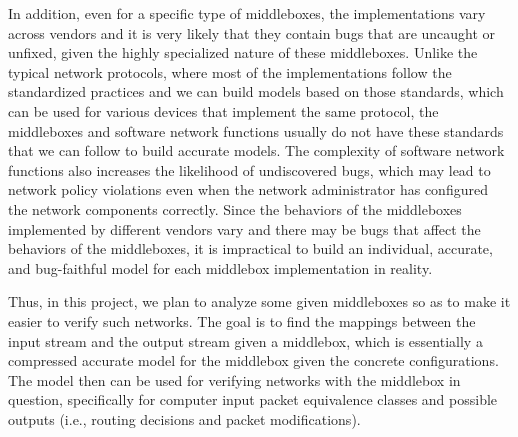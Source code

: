 In addition, even for a specific type of middleboxes, the implementations vary
across vendors and it is very likely that they contain bugs that are uncaught or
unfixed, given the highly specialized nature of these middleboxes. Unlike the
typical network protocols, where most of the implementations follow the
standardized practices and we can build models based on those standards, which
can be used for various devices that implement the same protocol, the
middleboxes and software network functions usually do not have these standards
that we can follow to build accurate models. The complexity of software network
functions also increases the likelihood of undiscovered bugs, which may lead to
network policy violations even when the network administrator has configured the
network components correctly. Since the behaviors of the middleboxes implemented
by different vendors vary and there may be bugs that affect the behaviors of the
middleboxes, it is impractical to build an individual, accurate, and
bug-faithful model for each middlebox implementation in reality.

Thus, in this project, we plan to analyze some given middleboxes so as to make
it easier to verify such networks. The goal is to find the mappings between the
input stream and the output stream given a middlebox, which is essentially a
compressed accurate model for the middlebox given the concrete configurations.
The model then can be used for verifying networks with the middlebox in
question, specifically for computer input packet equivalence classes and
possible outputs (i.e., routing decisions and packet modifications).


